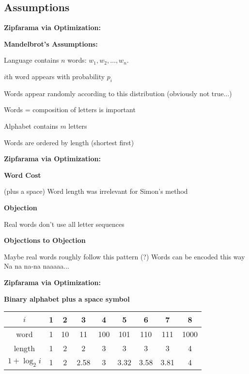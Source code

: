 \subsection{Assumptions}

  \textbf{Zipfarama via Optimization:}

  \textbf{Mandelbrot's Assumptions:}
    
     
      Language contains $n$ words: $w_1, w_2, \ldots, w_n$.
     
      $i$th word appears with probability $p_i$
     
      Words appear randomly according to this distribution (obviously not true...)
     
      Words = composition of letters is important
     
      Alphabet contains $m$ letters
     
      Words are ordered by length (shortest first)
    
  

  
  \textbf{Zipfarama via Optimization:}

  \textbf{Word Cost}
    
      (plus a space)
     Word length was irrelevant for Simon's method
    
  

\textbf{Objection}
  
   Real words don't use all letter sequences
  


\textbf{Objections to Objection}
  
   Maybe real words roughly follow this pattern (?)
   Words can be encoded this way
   Na na na-na naaaaa...
  




  \textbf{Zipfarama via Optimization:}

  \textbf{Binary alphabet plus a space symbol}
    \medskip
     {\small
    \begin{tabular}{|c|cccccccc|}
      \hline
      $i$ & 1 & 2 & 3 & 4 & 5 & 6 & 7 & 8 \\
      \hline
      word & 1 & 10 & 11 & 100 & 101 & 110 & 111 & 1000 \\
      \hline
      length & 1 & 2 & 2 & 3 & 3 & 3 & 3 & 4 \\
      \hline
      $1+\log_2 i$ & 1 & 2 & 2.58 & 3 & 3.32 & 3.58 & 3.81 & 4 \\
      \hline
    \end{tabular}
    }
  

